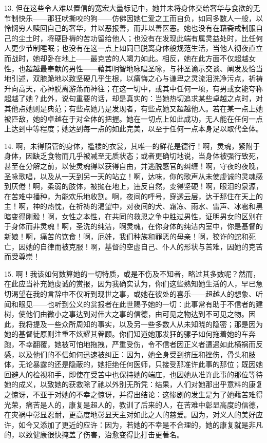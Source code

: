 13. 但在这些令人难以置信的宽宏大量标记中，她并未将身体交给奢华与食欲的无节制快乐——那狂吠撕咬的狗——仿佛因她仁爱之工而自负，如同多数人一般，以怜悯穷人赎回自己的奢华，并以恶报善，而非以善医恶。她也没有在藉斋戒制服自己的尘土时，将硬卧褥的苦功留给他人；也没有在发现此端有属灵益处时，比任何人更少节制睡眠；也没有在这一点上如同已脱离身体般规范生活，当他人彻夜直立而战时，她却卧在地上——最克苦的人竭力如此。相反，她在此方面不仅超越女性，也超越最奉献的男性——藉其明智地咏唱圣咏，与神圣谕示交谈、阐发及恰当地引述，双膝跪地以致坚硬几乎生根，以痛悔之心与谦卑之灵流泪洗净污点，祈祷升向高天，心神脱离游荡而神往；在这一切中，或其中任何一项，有男或女能夸称超越了她？此外，说句重要的话，却是真实的：当她热切追求某些卓越之点时，对其他点她则是典范；有些点她乃是发现者，有些点她又超越他人。若在某一点上她被匹敌，她的卓越在于对全体的把握。她在一切点上如此成功，无人能在任何一点上达到中等程度；她达到每一点的如此完美，以至于任何一点本身足以取代全体。\par

14. 啊，未得照管的身体，褴褛的衣裳，其唯一的鲜花是德行！啊，灵魂，紧附于身体，因缺乏食物而几乎被减至无质状态；或者更确切地说，当身体被强行致死，甚至在分解之前，以使灵魂得以获得自由，并逃脱感官的纠缠！啊，守夜的夜晚，圣咏歌唱，以及从一天到另一天的站立！啊，达味，你的歌声从未使虔诚的灵魂感到厌倦！啊，柔弱的肢体，被抛在地上，违反自然，变得坚硬！啊，眼泪的泉源，在苦难中播种，为能欢乐地收割。啊，夜间的呼号，穿透云层，达于那住在天上的主！啊，神的热忱，在祈祷的渴望中，对夜间的犬、霜冻、雨水、雷声、冰雹和黑暗变得刚毅！啊，女性之本性，在共同的救恩之争中胜过男性，证明男女的区别在于身体而非灵魂！啊，圣洗的纯洁，啊灵魂，在你身体的纯洁内室中，你是基督的新娘！啊，痛苦的饮食！啊，厄娃，我们种族和罪恶的母亲！啊，狡诈的蛇和死亡，因她的自律而被克服！啊，基督的空虚自己、仆人的形状与苦难，因她的克苦而受尊崇！\par

15. 啊！我该如何数算她的一切特质，或是不伤及不知者，略过其多数呢？然而，在此应当补充她虔诚的赏报，因为我确实认为，你们这些熟知她生活的人，早已急切渴望在我的言辞中不仅听到现世之事，或她在彼处的喜乐——超越人的想象、听闻和眼见——也听到公义的赏报者在此世赐予她的一切：此事常有助于不信者的建树，使他们由微小之事达到对伟大之事的信德，由可见之物达到不可见之物。因此，我将提及一些众所周知的事实，以及另一些多数人从未知晓的隐密；那是因为她的基督徒原则注重不炫耀其眷顾。你们知道她那发狂的骡子如何拖着她的车奔跑，不幸翻覆，她被可怕地拖拽，严重受伤，令不信者因正义者遭遇如此横祸而反感，以及他们的不信如何迅速被纠正：因为，她全身受到挤压和挫伤，骨头和肢体，无论暴露的还是隐蔽的，她拒绝任何医师，只接受那准许此事的那位；既因她回避人的检视和手，即使在受苦中也保持她的端庄，也因她从准许此事的那位等待她的成义，以致她的获救除了祂以外别无所凭：结果，人们对她那出乎意料的康复之惊讶，不亚于对她的不幸之惊讶，并得出结论：这惨剧的发生是为了她藉苦难得光荣，痛苦是人的，康复是超人的，教训了后来的人，在苦难中彰显高度的信德，在灾祸中彰显忍耐，更高度地彰显天主对如此之人的慈爱。因为，对义人的美好应许，如今又添加了更近的应许：因为，若她的不幸是不合理的，她的康复就是非凡的，以致健康很快掩盖了伤害，治愈变得比打击更著名。\par

